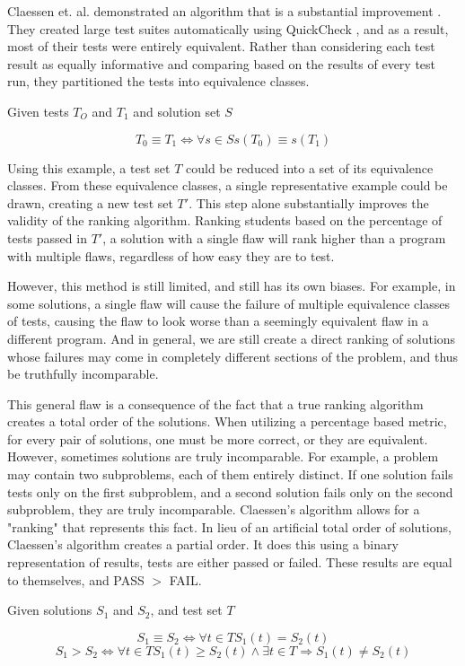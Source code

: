\documentclass[11pt]{article}
\begin{document}
Claessen et. al. demonstrated an algorithm that is a substantial improvement \cite{Claessen}. They created large test suites automatically using QuickCheck \cite{QuickCheck}, and as a result, most of their tests were entirely equivalent. Rather than considering each test result as equally informative and comparing based on the results of every test run, they partitioned the tests into equivalence classes.

\centerline{ Given tests $T_O$ and $T_1$ and solution set $S$}
$$ T_0 \equiv T_1 \iff \forall s \in S s(T_0) \equiv s(T_1) $$

Using this example, a test set $T$ could be reduced into a set of its equivalence classes. From these equivalence classes, a single representative example could be drawn, creating a new test set $T\prime$. This step alone substantially improves the validity of the ranking algorithm. Ranking students based on the percentage of tests passed in $T\prime$, a solution with a single flaw will rank higher than a program with multiple flaws, regardless of how easy they are to test.

However, this method is still limited, and still has its own biases. For example, in some solutions, a single flaw will cause the failure of multiple equivalence classes of tests, causing the flaw to look worse than a seemingly equivalent flaw in a different program. And in general, we are still create a direct ranking of solutions whose failures may come in completely different sections of the problem, and thus be truthfully incomparable.

This general flaw is a consequence of the fact that a true ranking algorithm creates a total order of the solutions. When utilizing a percentage based metric, for every pair of solutions, one must be more correct, or they are equivalent. However, sometimes solutions are truly incomparable. For example, a problem may contain two subproblems, each of them entirely distinct. If one solution fails tests only on the first subproblem, and a second solution fails only on the second subproblem, they are truly incomparable. Claessen's algorithm allows for a "ranking" that represents this fact. In lieu of an artificial total order of solutions, Claessen's algorithm creates a partial order. It does this using a binary representation of results, tests are either passed or failed. These results are equal to themselves, and PASS $>$ FAIL.

\centerline{Given solutions $S_1$ and $S_2$, and test set $T$}
$$S_1 \equiv S_2 \iff \forall t \in T S_1(t) = S_2(t)$$
$$S_1 > S_2 \iff \forall t \in T S_1(t) \geq S_2(t) \wedge \exists t \in T \Rightarrow S_1(t) \neq S_2(t)$$
\end{document}
